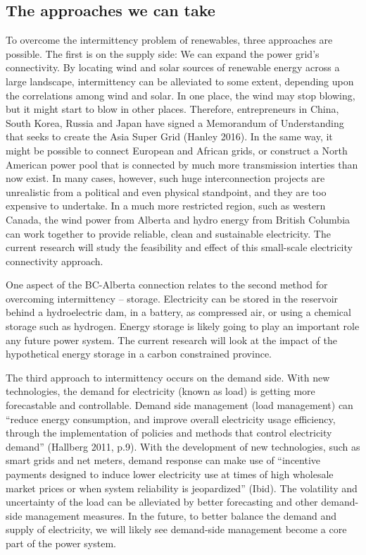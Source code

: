 \subsection{The approaches we can
take}\label{the-approaches-we-can-take}

To overcome the intermittency problem of renewables, three approaches
are possible. The first is on the supply side: We can expand the power
grid's connectivity. By locating wind and solar sources of renewable
energy across a large landscape, intermittency can be alleviated to some
extent, depending upon the correlations among wind and solar. In one
place, the wind may stop blowing, but it might start to blow in other
places. Therefore, entrepreneurs in China, South Korea, Russia and Japan
have signed a Memorandum of Understanding that seeks to create the Asia
Super Grid (Hanley 2016). In the same way, it might be possible to
connect European and African grids, or construct a North American power
pool that is connected by much more transmission interties than now
exist. In many cases, however, such huge interconnection projects are
unrealistic from a political and even physical standpoint, and they are
too expensive to undertake. In a much more restricted region, such as
western Canada, the wind power from Alberta and hydro energy from
British Columbia can work together to provide reliable, clean and
sustainable electricity. The current research will study the feasibility
and effect of this small-scale electricity connectivity approach.

One aspect of the BC-Alberta connection relates to the second method for
overcoming intermittency -- storage. Electricity can be stored in the
reservoir behind a hydroelectric dam, in a battery, as compressed air,
or using a chemical storage such as hydrogen. Energy storage is likely
going to play an important role any future power system. The current
research will look at the impact of the hypothetical energy storage in a
carbon constrained province.

The third approach to intermittency occurs on the demand side. With new
technologies, the demand for electricity (known as load) is getting more
forecastable and controllable. Demand side management (load management)
can ``reduce energy consumption, and improve overall electricity usage
efficiency, through the implementation of policies and methods that
control electricity demand'' (Hallberg 2011, p.9). With the development
of new technologies, such as smart grids and net meters, demand response
can make use of ``incentive payments designed to induce lower
electricity use at times of high wholesale market prices or when system
reliability is jeopardized'' (Ibid). The volatility and uncertainty of
the load can be alleviated by better forecasting and other demand-side
management measures. In the future, to better balance the demand and
supply of electricity, we will likely see demand-side management become
a core part of the power system.

